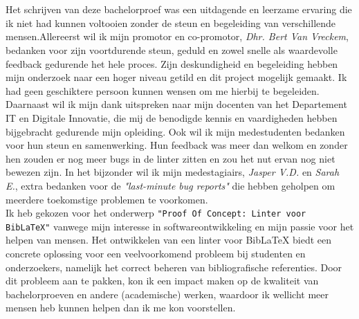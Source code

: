 
\chapter*{}%
\label{ch:voorwoord}


Het schrijven van deze bachelorproef was een uitdagende en leerzame ervaring die ik niet had kunnen voltooien zonder de steun en begeleiding van verschillende mensen.Allereerst wil ik mijn promotor en co-promotor, \emph{Dhr.\- Bert\- Van\- Vreckem}, bedanken voor zijn voortdurende steun, geduld en zowel snelle als waardevolle feedback gedurende het hele proces. Zijn deskundigheid en begeleiding hebben mijn onderzoek naar een hoger niveau getild en dit project mogelijk gemaakt. Ik had geen geschiktere persoon kunnen wensen om me hierbij te begeleiden.
\\ \newline{}
Daarnaast wil ik mijn dank uitspreken naar mijn docenten van het Departement IT en Digitale Innovatie, die mij de benodigde kennis en vaardigheden hebben bijgebracht gedurende mijn opleiding. Ook wil ik mijn medestudenten bedanken voor hun steun en samenwerking. Hun feedback was meer dan welkom en zonder hen zouden er nog meer bugs in de linter zitten en zou het nut ervan nog niet bewezen zijn. In het bijzonder wil ik mijn medestagiairs, \emph{Jasper V.D.} en \emph{Sarah E.}, extra bedanken voor de \emph{"last-minute bug reports"} die hebben geholpen om meerdere toekomstige problemen te voorkomen.
\\ \newline{}
Ik heb gekozen voor het onderwerp \texttt{"Proof Of Concept: Linter voor BibLaTeX"} vanwege mijn interesse in softwareontwikkeling en mijn passie voor het helpen van mensen. Het ontwikkelen van een linter voor BibLaTeX biedt een concrete oplossing voor een veelvoorkomend probleem bij studenten en onderzoekers, namelijk het correct beheren van bibliografische referenties. Door dit probleem aan te pakken, kon ik een impact maken op de kwaliteit van bachelorproeven en andere (academische) werken, waardoor ik wellicht meer mensen heb kunnen helpen dan ik me kon voorstellen.
